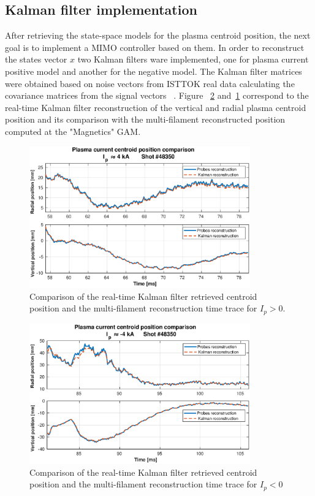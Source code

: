 \subsection{Kalman filter implementation}

After retrieving the state-space models for the plasma centroid position, the next goal is to implement a MIMO controller based on them. In order to reconstruct the states vector $x$ two Kalman filters ware implemented, one for plasma current positive model and another for the negative model. The Kalman filter matrices were obtained  based on noise vectors from ISTTOK real data calculating  the covariance matrices from the signal vectors ~\cite{Mele2018}.  Figure ~\ref{Kalman_neg} and~\ref{Kalman_pos} correspond to the real-time Kalman filter reconstruction of the vertical and radial plasma centroid position and its comparison with the multi-filament reconstructed  position computed at the "Magnetics" GAM.\smallskip

\begin{figure}[h]
	\centering
	\includegraphics[width=0.85\textwidth]{Chp5/Kalman_comp_pos.eps}
	\caption{ Comparison of the real-time Kalman filter retrieved centroid position and the multi-filament reconstruction time trace for $I_p>0$.\label{Kalman_pos}}
\end{figure}

\begin{figure}[h]
	\centering
	\includegraphics[width=0.85\textwidth]{Chp5/Kalman_comp_neg.eps}
	\caption{ Comparison of the real-time Kalman filter retrieved centroid position and the multi-filament reconstruction time trace for $I_p<0$\label{Kalman_neg}}
\end{figure}

